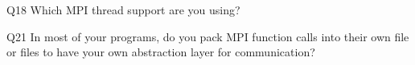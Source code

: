 \begin{description}%
\item{Q18} Which MPI thread support are you using?%
\item{Q21} In most of your programs, do you pack MPI function calls into their own file or files to have your own abstraction layer for communication?%
\end{description}%

